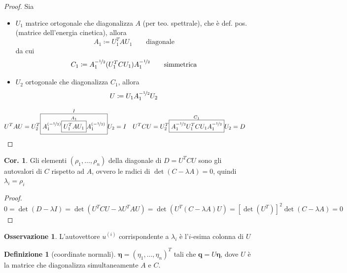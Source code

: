 \documentclass[a4paper,10pt]{article}
\theoremstyle{definition}
\newcommand{\bv}{\boldsymbol} %
\theoremstyle{indentdefinition}
\newtheorem{defn}{Definizione}[section]
\theoremstyle{indenttheorem}
\newtheorem{cor}{Cor.}
\theoremstyle{myremark}
\newtheorem*{rem*}{Osservazione}
\theoremstyle{indentgeneral}
\begin{document}
\begin{proof}
Sia 
\begin{itemize}
    \item $U_{1}$ matrice ortogonale che diagonalizza $A$ (per teo. spettrale), che è def. pos. (matrice dell'energia cinetica), allora
   $$A_{1}\coloneqq U_{1}^{T}AU_{1} \qquad \text{diagonale}$$
 da cui $$C_{1}\coloneqq A_{1}^{-\nicefrac{1}{2}}(U_{1}^{T}CU_{1})A_{1}^{-\nicefrac{1}{2}}\qquad \text{simmetrica}$$

\item $U_{2}$ ortogonale che diagonalizza $C_{1}$, allora
$$U\coloneqq U_{1}A_{1}^{-\nicefrac{1}{2}}U_{2}$$
\end{itemize} 
\begin{align*}
U^{T}AU & =U_{2}^{T}\overset{I}{\boxed{A_{1}^{\left(-\nicefrac{1}{2}\right)}\overset{A_{1}}{\boxed{U_{1}^{T}AU_{1}}}A_{1}^{\left(-\nicefrac{1}{2}\right)}}}U_{2}=I & U^{T}CU & =U_{2}^{T}\overset{C_{1}}{\boxed{A_{1}^{-\nicefrac{1}{2}}U_{1}^{T}CU_{1}A_{1}^{-\nicefrac{1}{2}}}}U_{2}=D
\end{align*}
\end{proof}
\begin{cor}
Gli elementi $\left(\rho_{1},\dots,\rho_{n}\right)$ della diagonale di $D=U^TCU$ sono gli autovalori di $C$ rispetto ad $A$, ovvero le radici
di $\det\left(C-\lambda A\right)=0$, quindi $\lambda_{i}=\rho_{i}$
\end{cor}

\begin{proof}
$0=\det\left(D-\lambda I\right)=\det\left(U^{T}CU-\lambda U^{T}AU\right)=\det\left(U^{T}\left(C-\lambda A\right)U\right)=\left[\det\left(U^{T}\right)\right]^{2}\det\left(C-\lambda A\right)=0$
\end{proof}
\begin{rem*}
L'autovettore $u^{\left(i\right)}$ corrispondente a $\lambda_{i}$
è l'$i$-esima colonna di $U$
\end{rem*}
\begin{defn}[coordinate normali]
\label{def:coordinate-normali}$\bv{\eta}=\left(\eta_{1},\dots,\eta_{n}\right)^{T}$
tali che $\bv{q}=U\bv{\eta}$, dove $U$ è la matrice che diagonalizza simultaneamente $A$ e $C$.
\end{defn}
\end{document}
